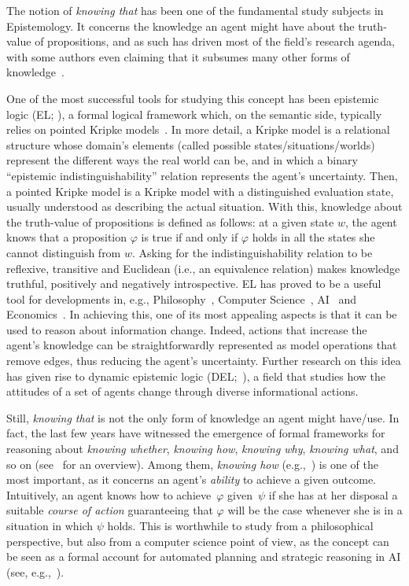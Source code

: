 The notion of \emph{knowing that} has been one of the fundamental study subjects in Epistemology. It concerns the knowledge an agent might have about the truth-value of propositions, and as such has driven most of the field's research agenda, with some authors even claiming that it subsumes many other forms of knowledge~\cite{BoenLycan75}. 
 
One of the most successful tools for studying this concept has been epistemic logic (EL; \cite{Hintikka:kab}), a formal logical framework which, on the semantic side, typically relies on pointed Kripke models~\cite{mlbook,HML}. In more detail, a Kripke model is a relational structure whose domain's elements (called possible states/situations/worlds) represent the different ways the real world can be, and in which a binary ``epistemic indistinguishability'' relation represents the agent's uncertainty. Then, a pointed Kripke model is a Kripke model with a distinguished evaluation state, usually understood as describing the actual situation. With this, knowledge about the truth-value of propositions is defined as follows: at a given state $w$, the agent knows that a proposition $\varphi$ is true if and only if $\varphi$ holds in all the states she cannot distinguish from $w$. Asking for the indistinguishability relation to be reflexive, transitive and Euclidean (i.e., an equivalence relation) makes knowledge truthful, positively and negatively introspective. EL has proved to be a useful tool for developments in, e.g., Philosophy~\cite{rfe,Holliday2018}, Computer Science~\cite{RAK}, AI~\cite{elfaics} and Economics~\cite{egepgt}. In achieving this, one of its most appealing aspects is that it can be used to reason about information change. Indeed, actions that increase the agent's knowledge can be straightforwardly represented as model operations that remove edges, thus reducing the agent's uncertainty. Further research on this idea has given rise to dynamic epistemic logic (DEL;~\cite{DELbook,vanBenthem2011ldii}), a field that studies how the attitudes of a set of agents change through diverse informational actions. 


Still, \emph{knowing that} is not the only form of knowledge an agent might have/use. In fact, the last few years have witnessed the emergence of formal frameworks for reasoning about \emph{knowing whether}, \emph{knowing how}, \emph{knowing why}, \emph{knowing what}, and so on (see~\cite{Wang16} for an overview). Among them, \emph{knowing how} (e.g.,~\cite{Pavese22}) is one of the most important, as it concerns an agent's \emph{ability} to achieve a given outcome. Intuitively, an agent knows how to achieve~$\varphi$ given~$\psi$ if she has at her disposal a suitable \emph{course of action} guaranteeing that $\varphi$ will be the case whenever she is in a situation in which $\psi$ holds. This is worthwhile to study from a philosophical perspective, but also from a computer science point of view, as the concept can be seen as a formal account for automated planning and strategic reasoning in AI (see, e.g.,~\cite{KandA15}).

